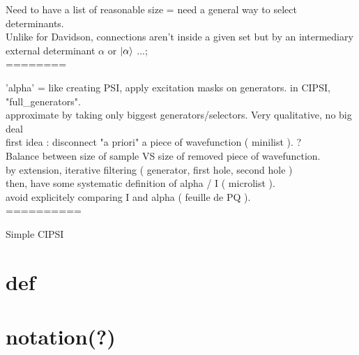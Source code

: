 
Need to have a list of reasonable size = need a general way to select determinants. \\

Unlike for Davidson, connections aren't inside a given set but by an intermediary external determinant $\alpha$ or $| \alpha \rangle$ ...; \\

========

'alpha' = like creating PSI, apply excitation masks on generators. in CIPSI, "full\_generators". \\
approximate by taking only biggest generators/selectors. Very qualitative, no big deal \\
first idea : disconnect "a priori" a piece of wavefunction ( minilist ). ?\\
Balance between size of sample VS size of removed piece of wavefunction. \\
by extension, iterative filtering ( generator, first hole, second hole ) \\
then, have some systematic definition of alpha / I ( microlist ). \\
avoid explicitely comparing I and alpha ( feuille de PQ ). \\

==========



\begin{algorithm}
	\caption{Simple CIPSI}
		\KwData{ $\Psi$ }
\end{algorithm}

\section{def}

\section{notation(?)}

